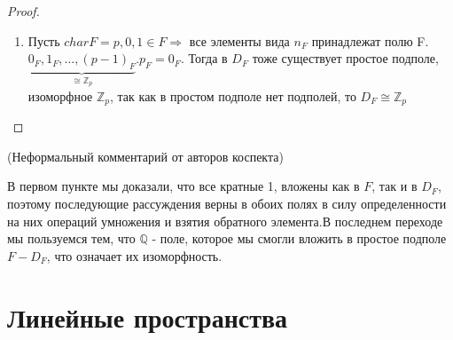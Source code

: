 \begin{proof}
\begin{enumerate}
		То есть данное отображение сохраняет сложение и умножение. Проверим инъективность. \newline
		Пусть \(\frac{m_1}{n_1}\to\text{ решению }n_{1F}x = m_{2F}, \frac{m_2}{n_2}\to\text{ решению }n_{2F}x = m_{2F}\newline\Longrightarrow \begin{gathered}
		x = n_{1F}^{-1}m_{1F} \quad|n_{1F}n_{2F}\\
		x = n_{2F}^{-1}m_{2F} \quad|n_{1F}n_{2F}
		\end{gathered}\Longrightarrow n_{2F}m_{1F} = n_{1F}m_{2F} \Longrightarrow (n_2m_1-n_1m_2)_F = 0 \Longrightarrow n_2m_1 = n_1m_2 \Longrightarrow \frac{m_1}{n_1} = \frac{m_2}{n_2}\). 
		То есть если совпадают образы, то совпадают и прообразы. \(\exists \) в F подполе, изоморфное $\mathbb{Q}$, в \(D_F \exists\) подполе, изоморфное \(\mathbb{Q} \Longrightarrow D_F \cong \mathbb{Q}\), так как \(D_F\) - просто подполе
		\item Пусть \(char F = p, 0, 1\in F\Longrightarrow\) все элементы вида \(n_F\) принадлежат полю F. \newline
		\(\underbrace{0_F, 1_F, \ldots, (p-1)_F}_{\cong \mathbb{Z}_p}. p_F = 0_F\). 
		Тогда в \(D_F\) тоже существует простое подполе, изоморфное \(\mathbb{Z}_p\), так как в простом подполе нет подполей, то \(D_F\cong\mathbb{Z}_p\)
	\end{enumerate}
\end{proof}

\begin{note}(Неформальный комментарий от авторов коспекта) 

	В первом пункте мы доказали, что все кратные 1, вложены как в $F$, так и в $D_F$, поэтому последующие рассуждения верны в обоих полях 
	в силу определенности на них операций умножения и взятия обратного элемента.В последнем переходе мы пользуемся тем, что $\mathbb{Q}$ - поле, 
	которое мы смогли вложить в простое подполе $F - D_F$, что означает их изоморфность. 
\end{note}

\section{Линейные пространства}

